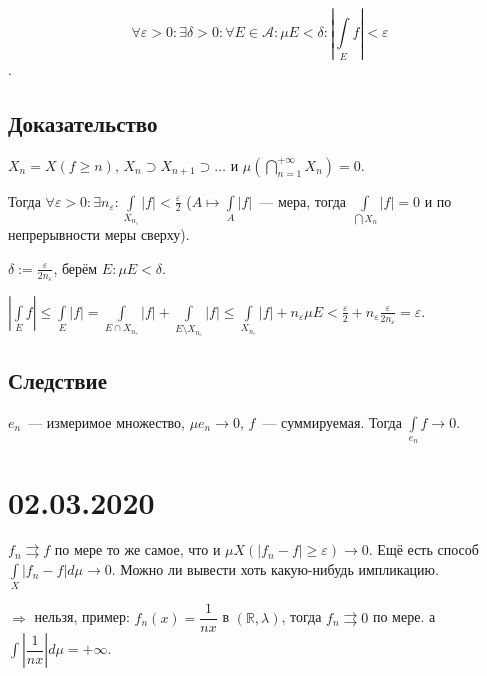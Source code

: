 \documentclass{article}
\begin{document}
        $$\forall \varepsilon > 0 : \exists \delta > 0 : \forall E \in \mathcal{A} : \mu E < \delta : \left| \int\limits_{E} f \right| < \varepsilon$$.
        
        \subsection{Доказательство}
        
            $X_n = X \left( f \geqslant n \right)$, $X_n \supset X_{n + 1} \supset \ldots$ и $\mu \left( \bigcap\limits^{+\infty}_{n = 1} X_n \right) = 0$.
            
            Тогда $\forall \varepsilon > 0 : \exists n_{\varepsilon} : \int\limits_{X_{n_{\varepsilon}}} |f| < \frac{\varepsilon}{2}$ ($A \mapsto \int\limits_{A} |f|$~--- мера, тогда $\int\limits_{\bigcap X_n} |f| = 0$ и по непрерывности меры сверху).
            
            $\delta := \frac{\varepsilon}{2 n_{\varepsilon}}$, берём $E : \mu E < \delta$.
            
            $\left| \int\limits_{E} f \right| \leqslant \int\limits_{E} |f| = \int\limits_{E \cap X_{n_{\varepsilon}}} |f| + \int\limits_{E \setminus X_{n_{\varepsilon}}} |f| \leqslant \int\limits_{X_{n_{\varepsilon}}} |f| + n_{\varepsilon} \mu E < \frac{\varepsilon}{2} + n_{\varepsilon} \frac{\varepsilon}{2 n_{\varepsilon}} = \varepsilon$.
            
        \subsection{Следствие}
        
            $e_n$~--- измеримое множество, $\mu e_n \rightarrow 0$, $f$~--- суммируемая. Тогда $\int\limits_{e_n} f \rightarrow 0$.
 
    \newpage
    
    \section{02.03.2020}
    
        $f_n \rightrightarrows f$ по мере то же самое, что и $\mu X( |f_n - f| \geqslant \varepsilon) \rightarrow 0$. Ещё есть способ $\int\limits_X |f_n - f| d \mu \rightarrow 0$. Можно ли вывести хоть какую-нибудь импликацию.
        
        $\Rightarrow$ нельзя, пример: $f_n(x) = \dfrac{1}{nx}$ в $(\mathbb{R}, \lambda)$, тогда $f_n \rightrightarrows 0$ по мере. а $\int \left| \dfrac{1}{nx} \right| d \mu = +\infty$.
        
\end{document}
